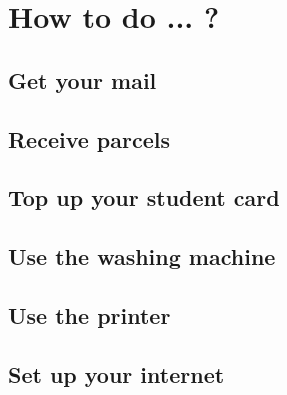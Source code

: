 \chapter{How to do ... ?} \label{chap:qna}

\section{Get your mail}

\section{Receive parcels}

\section{Top up your student card}

\section{Use the washing machine}

\section{Use the printer}

\section{Set up your internet}